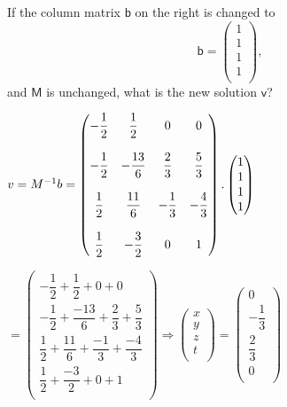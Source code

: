 \documentclass[fleqn]{article}
\begin{document}
\begin{enumerate}
    If the column matrix $\mathsf{b}$ on the right is changed to 
    \[
      \mathsf{b}
      =
      \left(
      \begin{array}{c}
          1 \\
          1 \\
          1 \\
          1 \\
      \end{array}
      \right),
    \]
    and $\mathsf{M}$ is unchanged, what is the new solution $\mathsf{v}$?

    \textcolor{hwColor}{
      $
        v=M^{-1}b \\
        \\
        =\begin{pmatrix}
          -\dfrac{1}{2} & \dfrac{1}{2} & 0 & 0 \\
          \\
          -\dfrac{1}{2} & -\dfrac{13}{6} & \dfrac{2}{3} & \dfrac{5}{3} \\
          \\
          \dfrac{1}{2} & \dfrac{11}{6} & -\dfrac{1}{3} & -\dfrac{4}{3} \\
          \\ 
          \dfrac{1}{2} & -\dfrac{3}{2} & 0 & 1 \\ 
        \end{pmatrix}.\begin{pmatrix}
          1 \\
          1 \\
          1 \\
          1 \\
        \end{pmatrix}
      $
    }

    \textcolor{hwColor}{
      $
        =\begin{pmatrix}
          -\dfrac{1}{2}+\dfrac{1}{2}+0+0 \\
          -\dfrac{1}{2}+\dfrac{-13}{6}+\dfrac{2}{3}+\dfrac{5}{3} \\
          \dfrac{1}{2}+\dfrac{11}{6}+\dfrac{-1}{3}+\dfrac{-4}{3} \\
          \dfrac{1}{2}+\dfrac{-3}{2}+0+1 \\
        \end{pmatrix}
        \Longrightarrow \begin{pmatrix}
          x \\
          y \\
          z \\
          t \\
        \end{pmatrix}=\begin{pmatrix}
          0 \\
          -\dfrac{1}{3} \\
          \dfrac{2}{3} \\
          0 \\
        \end{pmatrix}
      $
    }
    

\end{enumerate}
\end{document}
